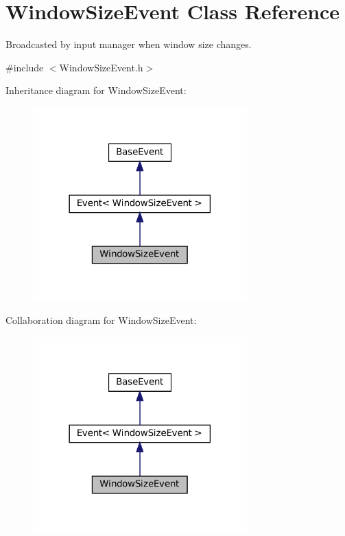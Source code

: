 \hypertarget{classWindowSizeEvent}{}\section{Window\+Size\+Event Class Reference}
\label{classWindowSizeEvent}


Broadcasted by input manager when window size changes.  




{\ttfamily \#include $<$Window\+Size\+Event.\+h$>$}



Inheritance diagram for Window\+Size\+Event\+:\nopagebreak
\begin{figure}[H]
\begin{center}
\leavevmode
\includegraphics[width=234pt]{classWindowSizeEvent__inherit__graph}
\end{center}
\end{figure}


Collaboration diagram for Window\+Size\+Event\+:\nopagebreak
\begin{figure}[H]
\begin{center}
\leavevmode
\includegraphics[width=234pt]{classWindowSizeEvent__coll__graph}
\end{center}
\end{figure}
